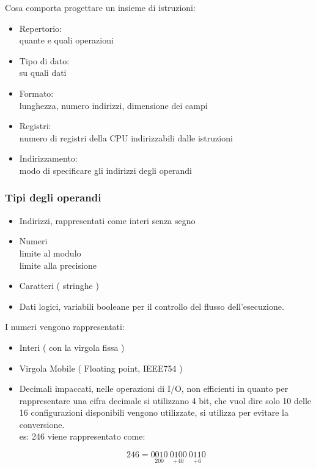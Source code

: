 \documentclass[arch.tex]{subfiles}
\begin{document}
Cosa comporta progettare un insieme di istruzioni:

\begin{itemize}
	\item Repertorio:\\
		quante e quali operazioni
	\item Tipo di dato:\\
		su quali dati
	\item Formato:\\
		lunghezza, numero indirizzi, dimensione dei campi
	\item Registri:\\
		numero di registri della CPU indirizzabili dalle istruzioni
	\item Indirizzamento:\\
		modo di specificare gli indirizzi degli operandi
\end{itemize}

\subsubsection{Tipi degli operandi}

\begin{itemize}
	\item Indirizzi, rappresentati come interi senza segno\\
	\item Numeri\\
		limite al modulo\\
		limite alla precisione\\
	\item Caratteri ( stringhe ) 
	\item Dati logici, variabili booleane per il controllo del flusso 
		dell'esecuzione.
\end{itemize}

I numeri vengono rappresentati:

\begin{itemize}
	\item Interi ( con la virgola fissa ) 
	\item Virgola Mobile ( Floating point, IEEE754 ) 
	\item Decimali impaccati, nelle operazioni di I/O,
		non efficienti in quanto per rappresentare una cifra decimale
		si utilizzano 4 bit, che vuol dire solo 10 delle 16 configurazioni
		disponibili vengono utilizzate, si utilizza per evitare la 
		conversione.\\
		es: 246 viene rappresentato come:

		\begin{equation}
			246 = \underset{200}{0010}\ \underset{ + 40	}{0100}\
			\underset{ + 6}{0110}
		\end{equation}
\end{itemize}
\end{document}
